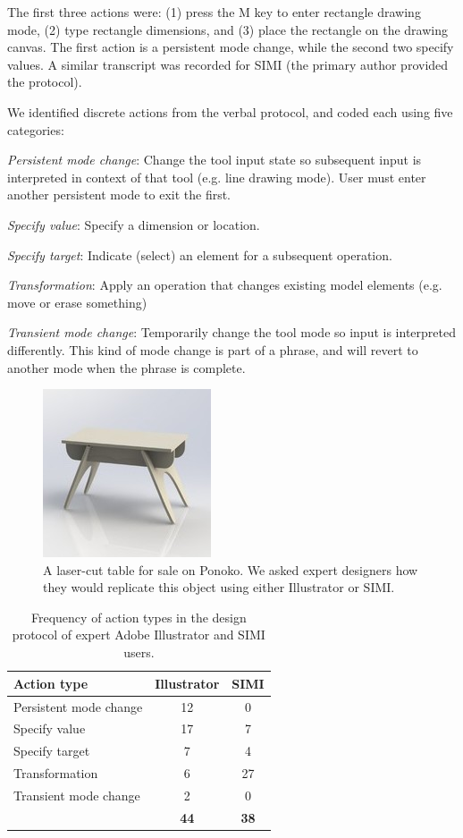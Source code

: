 \documentclass{article}
\begin{document}
The first three actions were: (1) press the M key to enter rectangle
drawing mode, (2) type rectangle dimensions, and (3) place the
rectangle on the drawing canvas. The first action is a persistent mode
change, while the second two specify values. A similar transcript was
recorded for SIMI (the primary author provided the protocol). 

We identified discrete actions from the verbal protocol, and coded
each using five categories:

\textit{Persistent mode change}: Change the tool input state so
subsequent input is interpreted in context of that tool (e.g. line
drawing mode). User must enter another persistent mode to exit the
first.

\textit{Specify value}: Specify a dimension or location.

\textit{Specify target}: Indicate (select) an element for a subsequent
operation.

\textit{Transformation}: Apply an operation that changes existing
model elements (e.g. move or erase something)

\textit{Transient mode change}: Temporarily change the tool mode so
input is interpreted differently. This kind of mode change is part of
a phrase, and will revert to another mode when the phrase is complete.

\begin{figure}[h]
  \centering
  \includegraphics[width=0.4\linewidth]{img/table.jpg}
  \caption{A laser-cut table for sale on Ponoko. We asked expert
    designers how they would replicate this object using either
    Illustrator or SIMI.}
  \label{fig:table}
\end{figure}

\begin{table}[h]
\centering
\begin{tabular}{ l c c }
\textbf{Action type} & \textbf{Illustrator} & \textbf{SIMI} \\
\hline
Persistent mode change & 12 & 0 \\
Specify value & 17 & 7 \\
Specify target & 7 & 4 \\
Transformation & 6 & 27 \\
Transient mode change & 2 & 0 \\
\hline
& \textbf{44} & \textbf{38} \\
\end{tabular}
\caption{Frequency of action types in the design protocol of expert
  Adobe Illustrator and SIMI users. }
\label{tab:expert}
\end{table}
\end{document}

